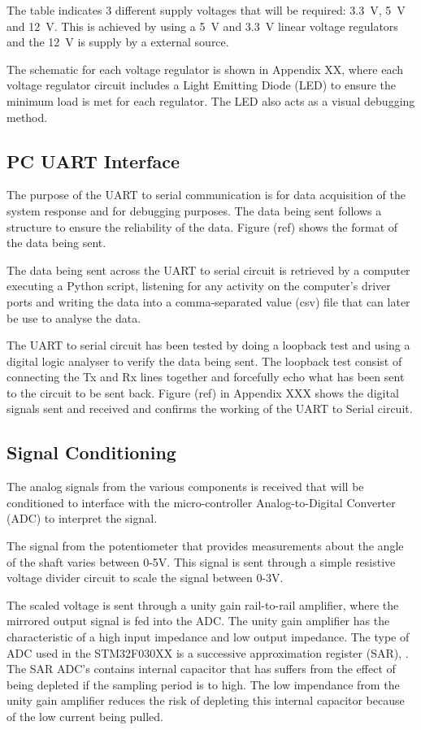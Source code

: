 \documentclass[a4paper,12pt]{article}
\begin{document}
	
	The table indicates 3 different supply voltages that will be required: \SI{3.3}{V}, \SI{5}{V} and \SI{12}{V}. This is achieved by using a \SI{5}{V} and \SI{3.3}{V} linear voltage regulators and the \SI{12}{V} is supply by a external source.
	
	The schematic for each voltage regulator is shown in Appendix XX, where each voltage regulator circuit includes a Light Emitting Diode (LED) to ensure the minimum load is met for each regulator. The LED also acts as a visual debugging method.

	
	\subsection{PC UART Interface }
	
	The purpose of the UART to serial communication is for data acquisition of the system response and for debugging purposes. The data being sent follows a structure to ensure the reliability of the data. Figure (ref) shows the format of the data being sent.
	
	The data being sent across the UART to serial circuit is retrieved by a computer executing a Python script, listening for any activity on the computer's driver ports and writing the data into a comma-separated value (csv) file that can later be use to analyse the data.
	
	
	The UART to serial circuit has been tested by doing a loopback test and using a digital logic analyser to verify the data being sent. The loopback test consist of connecting the Tx and Rx lines together and forcefully echo what has been sent to the circuit to be sent back. Figure (ref) in Appendix XXX shows the digital signals sent and received and confirms the working of the UART to Serial circuit.
	
	\subsection{Signal Conditioning}
	
	The analog signals from the various components is received that will be conditioned to interface with the micro-controller Analog-to-Digital Converter (ADC) to interpret the signal.
	
	The signal from the potentiometer that provides measurements about the angle of the shaft varies between 0-5V. This signal is sent through a simple resistive voltage divider circuit to scale the signal between 0-3V. 
	
	The scaled voltage is sent through a unity gain rail-to-rail amplifier, where the mirrored output signal is fed into the ADC. The unity gain amplifier has the characteristic of a high input impedance and low output impedance. The type of ADC used in the STM32F030XX is a successive approximation register (SAR), \cite{stm32_ADC:2017}. The SAR ADC's contains internal capacitor that has suffers from the effect of being depleted if the sampling period is to high. The low impendance from the unity gain amplifier reduces the risk of depleting this internal capacitor because of the low current being pulled.
	
\end{document}
